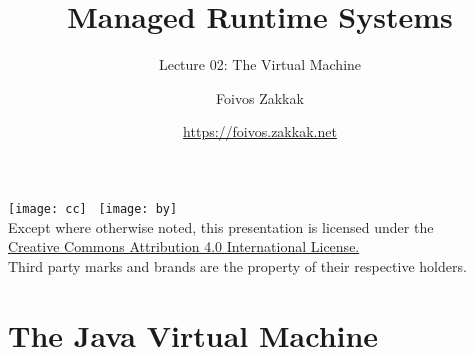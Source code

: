 \documentclass[
14pt,
aspectratio=169,
usenames,
dvipsnames,
x11names]{beamer}
\title{Managed Runtime Systems}
\subtitle{Lecture 02: The \java Virtual Machine}
\author[\url{https://foivos.zakkak.net}]{Foivos Zakkak}
\date{\url{https://foivos.zakkak.net}}
\begin{document}


\begin{frame}[plain]
  \titlepage
  \centering
  \texttt{[image: cc]}~
  \texttt{[image: by]}\\[1em]
  \scriptsize{Except where otherwise noted, this presentation is licensed under the\\
    \href{http://creativecommons.org/licenses/by/4.0/}%
    {Creative Commons Attribution 4.0 International License.}\\[1ex]
    Third party marks and brands are the property of their respective
    holders.}
\end{frame}


\section{The Java Virtual Machine}
\end{document}
